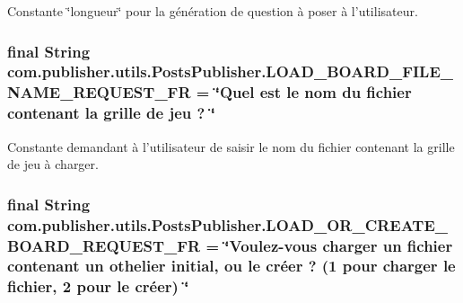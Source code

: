 Constante \char`\"{}longueur\char`\"{} pour la génération de question à poser à l'utilisateur. \hypertarget{interfacecom_1_1publisher_1_1utils_1_1PostsPublisher_a87515cd365fb9ad971ebf59a594d58cf}{
\subsubsection[{L\-O\-A\-D\-\_\-\-B\-O\-A\-R\-D\-\_\-\-F\-I\-L\-E\-\_\-\-N\-A\-M\-E\-\_\-\-R\-E\-Q\-U\-E\-S\-T\-\_\-\-F\-R}]{\setlength{\rightskip}{0pt plus 5cm}final String com.\-publisher.\-utils.\-Posts\-Publisher.\-L\-O\-A\-D\-\_\-\-B\-O\-A\-R\-D\-\_\-\-F\-I\-L\-E\-\_\-\-N\-A\-M\-E\-\_\-\-R\-E\-Q\-U\-E\-S\-T\-\_\-\-F\-R = \char`\"{}Quel est le nom du fichier contenant la grille de jeu ? \char`\"{}\hspace{0.3cm}{\ttfamily [static]}}}\label{interfacecom_1_1publisher_1_1utils_1_1PostsPublisher_a87515cd365fb9ad971ebf59a594d58cf}
Constante demandant à l'utilisateur de saisir le nom du fichier contenant la grille de jeu à charger. \hypertarget{interfacecom_1_1publisher_1_1utils_1_1PostsPublisher_a7e36fc896457c57287f9ef716e84001a}{
\subsubsection[{L\-O\-A\-D\-\_\-\-O\-R\-\_\-\-C\-R\-E\-A\-T\-E\-\_\-\-B\-O\-A\-R\-D\-\_\-\-R\-E\-Q\-U\-E\-S\-T\-\_\-\-F\-R}]{\setlength{\rightskip}{0pt plus 5cm}final String com.\-publisher.\-utils.\-Posts\-Publisher.\-L\-O\-A\-D\-\_\-\-O\-R\-\_\-\-C\-R\-E\-A\-T\-E\-\_\-\-B\-O\-A\-R\-D\-\_\-\-R\-E\-Q\-U\-E\-S\-T\-\_\-\-F\-R = \char`\"{}Voulez-\/vous charger un fichier contenant un othelier initial, ou le créer ? (1 pour charger le fichier, 2 pour le créer) \char`\"{}\hspace{0.3cm}{\ttfamily [static]}}}\label{interfacecom_1_1publisher_1_1utils_1_1PostsPublisher_a7e36fc896457c57287f9ef716e84001a}
